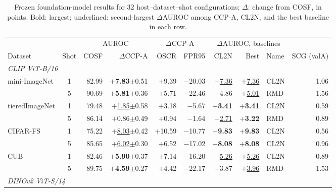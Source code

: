 \begin{table}[tbp]
\centering
\scriptsize
\setlength{\tabcolsep}{4pt}
\caption{Frozen foundation-model results for 32 host--dataset--shot configurations; $\Delta$: change from COSF, in points. Bold: largest; underlined: second-largest $\Delta$AUROC among CCP-A, CL2N, and the best baseline in each row.}\label{tab:foundation}
\begin{tabular}{lcrrrrrrlr}
\toprule
 & & \multicolumn{2}{c}{AUROC} & \multicolumn{2}{c}{$\Delta$CCP-A} & \multicolumn{3}{c}{$\Delta$AUROC, baselines} & \\
\cmidrule(lr){3-4}\cmidrule(lr){5-6}\cmidrule(lr){7-9}
Dataset & Shot & COSF & $\Delta$CCP-A & OSCR & FPR95 & CL2N & Best & Name & SCG (valA) \\
\midrule
\multicolumn{10}{l}{\textit{CLIP ViT-B/16}} \\
mini-ImageNet & 1 & 82.99 & \textbf{\boldmath $+$7.83}{\tiny$\pm$0.51} & $+$9.39 & $-$20.03 & \underline{$+$7.36} & \underline{$+$7.36} & CL2N & 1.06 \\
 & 5 & 90.69 & \textbf{\boldmath $+$5.81}{\tiny$\pm$0.36} & $+$5.71 & $-$22.46 & $+$4.86 & \underline{$+$5.01} & RMD & 1.56 \\
tieredImageNet & 1 & 79.48 & \underline{$+$1.85}{\tiny$\pm$0.58} & $+$3.18 & $-$5.67 & \textbf{\boldmath $+$3.41} & \textbf{\boldmath $+$3.41} & CL2N & 0.59 \\
 & 5 & 86.14 & $+$0.86{\tiny$\pm$0.49} & $+$0.94 & $-$1.64 & \underline{$+$2.71} & \textbf{\boldmath $+$3.22} & RMD & 0.89 \\
CIFAR-FS & 1 & 75.22 & \underline{$+$8.03}{\tiny$\pm$0.42} & $+$10.59 & $-$10.77 & \textbf{\boldmath $+$9.83} & \textbf{\boldmath $+$9.83} & CL2N & 0.56 \\
 & 5 & 85.65 & \underline{$+$6.02}{\tiny$\pm$0.30} & $+$6.52 & $-$17.02 & \textbf{\boldmath $+$8.08} & \textbf{\boldmath $+$8.08} & CL2N & 0.96 \\
CUB & 1 & 82.46 & \textbf{\boldmath $+$5.90}{\tiny$\pm$0.37} & $+$7.14 & $-$16.20 & \underline{$+$5.26} & \underline{$+$5.26} & CL2N & 0.89 \\
 & 5 & 89.75 & \textbf{\boldmath $+$4.59}{\tiny$\pm$0.27} & $+$4.42 & $-$22.17 & $+$3.87 & \underline{$+$3.96} & RMD & 1.53 \\
\midrule
\multicolumn{10}{l}{\textit{DINOv2 ViT-S/14}} \\

\end{tabular}
\end{table}
